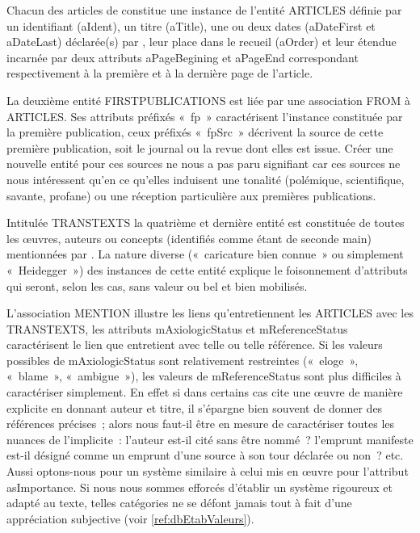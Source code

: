 \documentclass[12pt, a4paper]{article}
\begin{document}
Chacun des articles de \punr{} constitue une instance de l'entité ARTICLES définie par un identifiant (aIdent), un titre (aTitle), une ou deux dates (aDateFirst et aDateLast) déclarée(s) par \robbe{}, leur place dans le recueil (aOrder) et leur étendue incarnée par deux attributs aPageBegining et aPageEnd correspondant respectivement à la première et à la dernière page de l'article.

La deuxième entité FIRSTPUBLICATIONS est liée par une association FROM à 
ARTICLES. Ses attributs préfixés «~fp~» caractérisent l'instance constituée par la première publication, ceux préfixés «~fpSrc~» décrivent la source de cette première publication, soit le journal ou la revue dont elles est issue. Créer une nouvelle entité pour ces sources ne nous a pas paru signifiant car ces sources ne nous intéressent qu'en ce qu'elles induisent une tonalité (polémique, scientifique, savante, profane) ou une réception particulière aux premières publications.


Intitulée TRANSTEXTS la quatrième et dernière entité est constituée de toutes les œuvres, auteurs ou concepts (identifiés comme étant de seconde main) mentionnées par \robbe{}. La nature diverse («~caricature bien connue~» ou simplement «~Heidegger~») des instances de cette entité explique le foisonnement d'attributs qui seront, selon les cas, sans valeur ou bel et bien mobilisés.

L'association MENTION illustre les liens qu'entretiennent les ARTICLES avec les TRANSTEXTS, les attributs mAxiologicStatus et mReferenceStatus caractérisent le lien que \punr{} entretient avec telle ou telle référence. Si les valeurs possibles de mAxiologicStatus sont relativement restreintes («~eloge~», «~blame~», «~ambigue~»), les valeurs de mReferenceStatus sont plus difficiles à caractériser simplement. En effet si dans certains cas \robbe{} cite une œuvre de manière explicite en donnant auteur et titre, il s'épargne bien souvent de donner des références précises~; alors nous faut-il être en mesure de caractériser toutes les nuances de l'implicite~: l'auteur est-il cité sans être nommé~? l'emprunt manifeste est-il désigné comme un emprunt d'une source à son tour déclarée ou non~? etc. Aussi optons-nous pour un système similaire à celui mis en œuvre pour l'attribut asImportance. Si nous nous sommes efforcés d'établir un système rigoureux et adapté au texte, telles catégories ne se défont jamais tout à fait d'une appréciation subjective (voir \ref{ref:dbEtabValeurs}).
\end{document}
